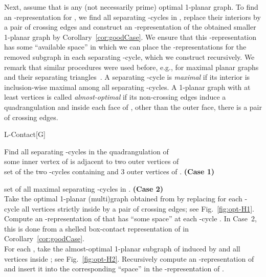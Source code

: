 \documentclass{article}
\newcommand{\df}{\textit}
\newcommand{\LL}{\xspace}
\begin{document}
Next, assume that  is any (not necessarily prime) optimal 1-planar graph.
To find an \LL-representation for , we find all separating -cycles in , replace their interiors by a pair of crossing edges and construct an \LL-representation of the obtained smaller 1-planar graph by Corollary~\ref{cor:goodCase}.
We ensure that this \LL-representation has some ``available space'' in which we can place the \LL-representations for the removed subgraph in each separating -cycle, which we construct recursively.
We remark that similar procedures were used before, e.g., for maximal planar graphs and their separating triangles~\cite{FF11,Tho88}.
A separating -cycle is \df{maximal} if its interior is inclusion-wise maximal among all separating -cycles.
A 1-planar graph with at least  vertices is called \df{almost-optimal} if its non-crossing edges induce a quadrangulation  and inside each face of , other than the outer face, there is a pair of crossing edges.





\newcommand{\lt}{\textbf{Let} }
\newcommand{\drawOpt}{algorithm \textbf{L-Contact}}

\hspace{-0.02\textwidth}
\parbox{0.97\textwidth}
{
\begin{algorithm}{L-Contact}[G]
	{
}



	Find all separating -cycles in the quadrangulation  of \\

	\qif some inner vertex  of  is adjacent to two outer vertices of \\

		\qthen
		 set of the two -cycles containing  and 3 outer vertices of .
		 \textbf{(Case 1)}

		\qelse
		 set of all maximal separating -cycles in .
		\textbf{(Case 2)}
	\qfi\\

	Take the optimal 1-planar (multi)graph  obtained from  by replacing
	for each -cycle  all vertices strictly inside 
	by a pair of crossing edges; see Fig.~\ref{fig:opt-H1}.
	\label{step:define_G_out}\\

	Compute an \LL-representation of  that has ``some space'' at each -cycle
	. In Case~2, this is done from a shelled box-contact representation
	of  in Corollary~\ref{cor:goodCase}.
	\label{step:G_out}\\

For each , take the almost-optimal 1-planar
	subgraph  of  induced by  and all vertices inside ;
	see Fig.~\ref{fig:opt-H2}. Recursively compute an \LL-representation of 
	and insert it into the corresponding ``space'' in the \LL-representation of .
	\label{step:G_in}

\end{algorithm}
}
\end{document}
